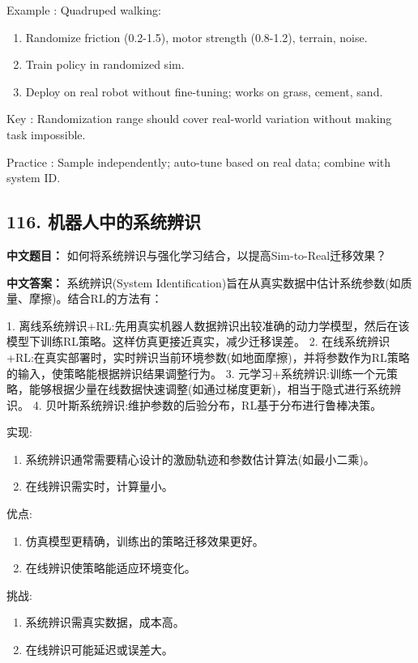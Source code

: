 \documentclass[10pt,a4paper]{ctexart}
\begin{document}
 Example : Quadruped walking:
\begin{enumerate}
    \item Randomize friction (0.2-1.5), motor strength (0.8-1.2), terrain, noise.
    \item Train policy in randomized sim.
    \item Deploy on real robot without fine-tuning; works on grass, cement, sand.
\end{enumerate}

 Key : Randomization range should cover real-world variation without making task impossible.

 Practice : Sample independently; auto-tune based on real data; combine with system ID.

\subsection*{116. 机器人中的系统辨识}
\textbf{中文题目：} 如何将系统辨识与强化学习结合，以提高Sim-to-Real迁移效果？

\textbf{中文答案：}  
系统辨识(System Identification)旨在从真实数据中估计系统参数(如质量、摩擦)。结合RL的方法有：

1.  离线系统辨识+RL:先用真实机器人数据辨识出较准确的动力学模型，然后在该模型下训练RL策略。这样仿真更接近真实，减少迁移误差。
2.  在线系统辨识+RL:在真实部署时，实时辨识当前环境参数(如地面摩擦)，并将参数作为RL策略的输入，使策略能根据辨识结果调整行为。
3.  元学习+系统辨识:训练一个元策略，能够根据少量在线数据快速调整(如通过梯度更新)，相当于隐式进行系统辨识。
4.  贝叶斯系统辨识:维护参数的后验分布，RL基于分布进行鲁棒决策。

 实现:
\begin{enumerate}
    \item 系统辨识通常需要精心设计的激励轨迹和参数估计算法(如最小二乘)。
    \item 在线辨识需实时，计算量小。
\end{enumerate}

 优点:
\begin{enumerate}
    \item 仿真模型更精确，训练出的策略迁移效果更好。
    \item 在线辨识使策略能适应环境变化。
\end{enumerate}

 挑战:
\begin{enumerate}
    \item 系统辨识需真实数据，成本高。
    \item 在线辨识可能延迟或误差大。
\end{enumerate}
\end{document}
